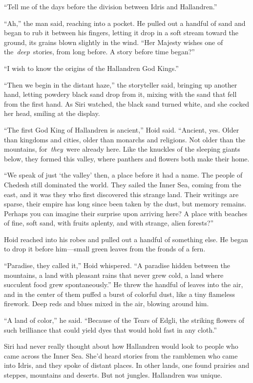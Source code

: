 “Tell me of the days before the division between Idris and Hallandren.”

“Ah,” the man said, reaching into a pocket. He pulled out a handful of sand and began to rub it between his fingers, letting it drop in a soft stream toward the ground, its grains blown slightly in the wind. “Her Majesty wishes one of the~\textit{deep}~stories, from long before. A story before time began?”

“I wish to know the origins of the Hallandren God Kings.”

“Then we begin in the distant haze,” the storyteller said, bringing up another hand, letting powdery black sand drop from it, mixing with the sand that fell from the first hand. As Siri watched, the black sand turned white, and she cocked her head, smiling at the display.

“The first God King of Hallandren is ancient,” Hoid said. “Ancient, yes. Older than kingdoms and cities, older than monarchs and religions. Not older than the mountains, for~\textit{they}~were already here. Like the knuckles of the sleeping giants below, they formed this valley, where panthers and flowers both make their home.

“We speak of just ‘the valley’ then, a place before it had a name. The people of Chedesh still dominated the world. They sailed the Inner Sea, coming from the east, and it was they who first discovered this strange land. Their writings are sparse, their empire has long since been taken by the dust, but memory remains. Perhaps you can imagine their surprise upon arriving here? A place with beaches of fine, soft sand, with fruits aplenty, and with strange, alien forests?”

Hoid reached into his robes and pulled out a handful of something else. He began to drop it before him—small green leaves from the fronds of a fern.

“Paradise, they called it,” Hoid whispered. “A paradise hidden between the mountains, a land with pleasant rains that never grew cold, a land where succulent food grew spontaneously.” He threw the handful of leaves into the air, and in the center of them puffed a burst of colorful dust, like a tiny flameless firework. Deep reds and blues mixed in the air, blowing around him.

“A land of color,” he said. “Because of the Tears of Edgli, the striking flowers of such brilliance that could yield dyes that would hold fast in any cloth.”

Siri had never really thought about how Hallandren would look to people who came across the Inner Sea. She’d heard stories from the ramblemen who came into Idris, and they spoke of distant places. In other lands, one found prairies and steppes, mountains and deserts. But not jungles. Hallandren was unique.

